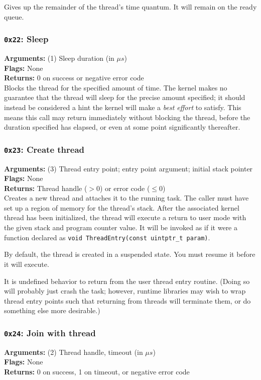 \documentclass[11pt]{article}
\begin{document}
Gives up the remainder of the thread's time quantum. It will remain on the ready queue.

\subsubsection{{\tt 0x22}: Sleep}
\textbf{Arguments:} (1) Sleep duration (in $\mu s$) \\
\textbf{Flags:} None \\
\textbf{Returns:} 0 on success or negative error code \\

Blocks the thread for the specified amount of time. The kernel makes no guarantee that the thread will sleep for the precise amount specified; it should instead be considered a hint the kernel will make a \textit{best effort} to satisfy. This means this call may return immediately without blocking the thread, before the duration specified has elapsed, or even at some point significantly thereafter.

\subsubsection{{\tt 0x23}: Create thread}
\textbf{Arguments:} (3) Thread entry point; entry point argument; initial stack pointer \\
\textbf{Flags:} None \\
\textbf{Returns:} Thread handle ($>0$) or error code ($\leq0$) \\

Creates a new thread and attaches it to the running task. The caller must have set up a region of memory for the thread's stack. After the associated kernel thread has been initialized, the thread will execute a return to user mode with the given stack and program counter value. It will be invoked as if it were a function declared as \texttt{void ThreadEntry(const uintptr\_t param)}.

By default, the thread is created in a suspended state. You must resume it before it will execute.

It is undefined behavior to return from the user thread entry routine. (Doing so will probably just crash the task; however, runtime libraries may wish to wrap thread entry points such that returning from threads will terminate them, or do something else more desirable.)

\subsubsection{{\tt 0x24}: Join with thread}
\textbf{Arguments:} (2) Thread handle, timeout (in $\mu s$) \\
\textbf{Flags:} None \\
\textbf{Returns:} 0 on success, 1 on timeout, or negative error code \\
\end{document}

